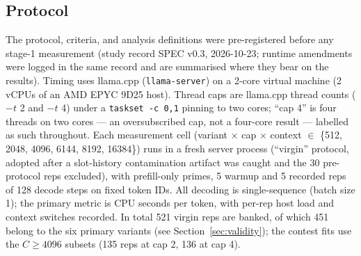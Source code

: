 \documentclass[10pt,letterpaper,twocolumn]{article}
\begin{document}
\subsection{Protocol}
The protocol, criteria, and analysis definitions were
pre-registered before any stage-1 measurement (study record
SPEC v0.3, 2026-10-23; runtime amendments were logged in the
same record and are summarised where they bear on the results).
Timing uses llama.cpp (\texttt{llama-server}) on a 2-core virtual
machine (2 vCPUs of an AMD EPYC 9D25 host). Thread caps are llama.cpp thread counts ($-t$ 2 and
$-t$ 4) under a \texttt{taskset -c 0,1} pinning to two cores; ``cap 4''
is four threads on two cores --- an oversubscribed cap, not a
four-core result --- labelled as such throughout. Each measurement
cell (variant $\times$ cap $\times$ context $\in$
\{512, 2048, 4096, 6144, 8192, 16384\}) runs in a fresh server
process (``virgin'' protocol, adopted after a slot-history
contamination artifact was caught and the 30 pre-protocol reps
excluded), with prefill-only primes, 5 warmup and 5 recorded reps of 128 decode steps on fixed token IDs.
All decoding is single-sequence (batch size 1); the primary metric is CPU seconds per token, with per-rep host load and context switches recorded. In total 521 virgin
reps are banked, of which 451 belong to the six primary variants
(see Section~\ref{sec:validity}); the contest fits use the
$C\geq4096$ subsets (135 reps at cap 2, 136 at cap 4).
\end{document}
